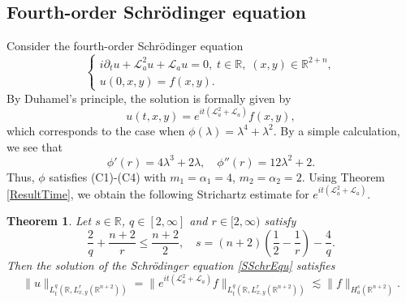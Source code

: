 \documentclass[a4paper,11pt, reqno]{amsart}
\numberwithin{equation}{section}
\theoremstyle{plain}
\newtheorem{theorem}{Theorem}[section]
\theoremstyle{definition}
\theoremstyle{remark}
\begin{document}
\subsection{Fourth-order Schr\"{o}dinger equation}
Consider the fourth-order Schr\"{o}dinger equation
	\begin{equation}\label{SSchrEqu}
	\begin{cases}
	i\partial_tu+\mathcal{L}_a^2u+\mathcal{L}_a u=0,\;t\in\mathbb{R},\; (x,y)\in\mathbb{R}^{2+n},\\
	u(0,x,y)=f(x,y).
	\end{cases}
	\end{equation}
By Duhamel's principle, the solution is formally given by
	\begin{equation*}\label{solution3}
	u(t,x,y)=e^{it(\mathcal{L}_a^2+\mathcal{L}_a)}f(x,y),
	\end{equation*}
which corresponds to the case when $\phi(\lambda)=\lambda^4+\lambda^2$. By a simple calculation, we see that 
	\begin{equation*}
	\phi'(r)=4\lambda^3+2\lambda, \quad
	\phi''(r)=12\lambda^2+2.
	\end{equation*}
Thus, $\phi$ satisfies (C1)-(C4) with $m_1=\alpha_1=4$, $m_2=\alpha_2=2$.  Using  Theorem \ref{ResultTime}, we obtain the following Strichartz estimate for  $e^{it(\mathcal{L}_a^2+\mathcal{L}_a)}$. 
\begin{theorem}
Let $s\in\mathbb{R}$, $q\in [2,\infty]$ and  $r\in [2,\infty)$ satisfy
\begin{equation*}
\frac{2}{q}+\frac{n+2}{r}\leq \frac{n+2}{2},\quad s=(n+2)\left(\frac{1}{2}-\frac{1}{r}\right)-\frac{4}{q}.
\end{equation*}
Then the solution of the Schr\"odinger equation \eqref{SSchrEqu} satisfies
\begin{equation*}
\|u\|_{L_t^q(\mathbb{R},L^r_{x,y}(\mathbb{R}^{n+2}))}=\|e^{it(\mathcal{L}_a^2+\mathcal{L}_a)}f\|_{L_t^q(\mathbb{R},L^r_{x,y}(\mathbb{R}^{n+2}))}\lesssim \|f\|_{H^s_a(\mathbb{R}^{n+2})}.
\end{equation*}
\end{theorem}
\end{document}
